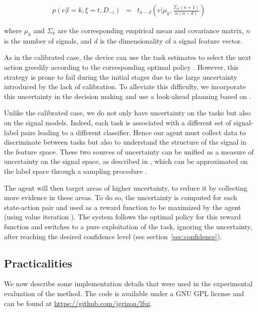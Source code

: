 \documentclass[10pt,letterpaper]{article}
\begin{document}
\begin{eqnarray}
	p(e| l=k,\xi=t, D_{-i}) & = & t_{n-d}\left(e | \mu_k,\frac{\Sigma_k (n+1)}{n(n-d)}\right)
\end{eqnarray}

where $\mu_k$ and $\Sigma_k$ are the corresponding empirical mean and covariance matrix, $n$ is the number of signals, and $d$ is the dimensionality of a signal feature vector.
%

As in the calibrated case, the device can use the task estimates to select the next action greedily according to the corresponding optimal policy \cite{iturrate13}. However, this strategy is prone to fail during the initial stages due to the large uncertainty introduced by the lack of calibration. To alleviate this difficulty, we incorporate this uncertainty in the decision making and use a look-ahead planning based on \cite{grizou2014interactive}.

Unlike the calibrated case, we do not only have uncertainty on the tasks but also on the signal models. Indeed, each task is associated with a different set of signal-label pairs leading to a different classifier. Hence our agent must collect data to discriminate between tasks but also to understand the structure of the signal in the feature space. These two sources of uncertainty can be unified as a measure of uncertainty on the signal space, as described in \cite{grizou2014calibration}, which can be approximated on the label space through a sampling procedure \cite{grizou2014interactive}.


The agent will then target areas of higher uncertainty, to reduce it by collecting more evidence in these areas. To do so, the uncertainty is computed for each state-action pair and used as a reward function to be maximized by the agent (using value iteration \cite{barto1998reinforcement}).
The system follows the optimal policy for this reward function and switches to a pure exploitation of the task, ignoring the uncertainty, after reaching the desired confidence level (see section~\ref{sec:confidence}).

\subsection{Practicalities}
We now describe some implementation details that were used in the experimental evaluation of the method.  The code is available under a GNU GPL license and can be found at \url{https://github.com/jgrizou/lfui}.
\end{document}
